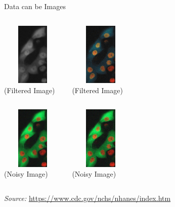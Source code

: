 \begin{frame}[t]{Data can be Images}
	\centering\tiny
	\begin{columns}[T]
		\includegraphics[height=3cm, width=3cm]{img/gaussian} \\ (Filtered 
		Image)
		
		\includegraphics[height=3cm, width=3cm]{img/median} \\ (Filtered Image)
	\end{columns}
	
	\vspace{10pt}
	\centering\tiny 
	\begin{columns}[T]
		\includegraphics[height=3cm, width=3cm]{img/nlm} \\ (Noisy Image)
		
		\includegraphics[height=3cm, width=3cm]{img/noisy_img} \\ (Noisy Image)
	\end{columns}
	\textit{Source:} \url{https://www.cdc.gov/nchs/nhanes/index.htm}
\end{frame}

